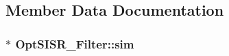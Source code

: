 \subsection{Member Data Documentation}
\hypertarget{class_opt_s_i_s_r___filter_d1eea7d9e7f91df64dd7550bf764c64f}{
\subsubsection[{sim}]{$\ast$ {\bf OptSISR\_\-Filter::sim}}}
\label{class_opt_s_i_s_r___filter_d1eea7d9e7f91df64dd7550bf764c64f}


